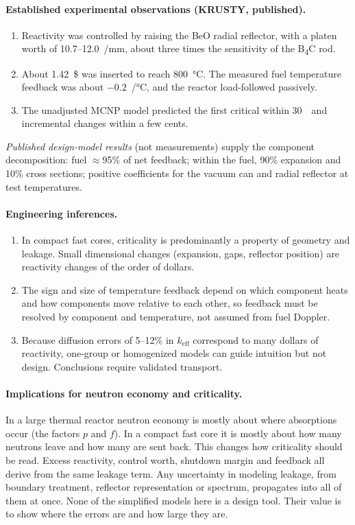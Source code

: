 \documentclass[11pt,letterpaper]{article}
\newcommand{\keff}{k_\mathrm{eff}}
\begin{document}
\paragraph{Established experimental observations (KRUSTY, published).}
\begin{enumerate}[label=E\arabic*.]
  \item Reactivity was controlled by raising the BeO radial reflector, with a platen worth of 10.7--12.0~\textcent/mm, about three times the sensitivity of the B\textsubscript{4}C rod.
  \item About 1.42~\$ was inserted to reach \SI{800}{\celsius}. The measured fuel temperature feedback was about $-0.2$~\textcent/\si{\celsius}, and the reactor load-followed passively.
  \item The unadjusted MCNP model predicted the first critical within 30~\textcent\ and incremental changes within a few cents.
\end{enumerate}
\emph{Published design-model results} (not measurements) supply the component decomposition: fuel $\approx$95\% of net feedback; within the fuel, 90\% expansion and 10\% cross sections; positive coefficients for the vacuum can and radial reflector at test temperatures.

\paragraph{Engineering inferences.}
\begin{enumerate}[label=I\arabic*.]
  \item In compact fast cores, criticality is predominantly a property of geometry and leakage. Small dimensional changes (expansion, gaps, reflector position) are reactivity changes of the order of dollars.
  \item The sign and size of temperature feedback depend on which component heats and how components move relative to each other, so feedback must be resolved by component and temperature, not assumed from fuel Doppler.
  \item Because diffusion errors of 5--12\% in $\keff$ correspond to many dollars of reactivity, one-group or homogenized models can guide intuition but not design. Conclusions require validated transport.
\end{enumerate}

\paragraph{Implications for neutron economy and criticality.}
In a large thermal reactor neutron economy is mostly about where absorptions occur (the factors $p$ and $f$). In a compact fast core it is mostly about how many neutrons leave and how many are sent back. This changes how criticality should be read. Excess reactivity, control worth, shutdown margin and feedback all derive from the same leakage term. Any uncertainty in modeling leakage, from boundary treatment, reflector representation or spectrum, propagates into all of them at once. None of the simplified models here is a design tool. Their value is to show where the errors are and how large they are.
\end{document}
